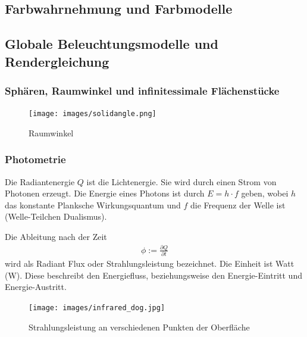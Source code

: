 \subsection{Farbwahrnehmung und Farbmodelle}

\subsection{Globale Beleuchtungsmodelle und Rendergleichung}

\subsubsection{Sphären, Raumwinkel und infinitessimale Flächenstücke}

 \begin{figure}[H]
    \centering
    \texttt{[image: images/solidangle.png]}
    \caption{Raumwinkel}
    \label{fig:cray}
\end{figure}

\subsubsection{Photometrie}

Die Radiantenergie $Q$ ist die Lichtenergie. Sie wird durch einen Strom von Photonen erzeugt. Die Energie eines Photons ist 
durch $E=h \cdot f$ geben, wobei $h$ das konstante Planksche Wirkungsquantum und $f$ die Frequenz der Welle ist (Welle-Teilchen Dualismus).  

\begin{Definition}
Die Ableitung nach der Zeit
\begin{align}
\phi := \frac{\partial Q}{\partial t}
\end{align}
wird als Radiant Flux oder Strahlungsleistung bezeichnet. Die Einheit ist Watt (W).
Diese  beschreibt den Energiefluss, beziehungsweise den Energie-Eintritt und Energie-Austritt.
\end{Definition}

 \begin{figure}[H]
    \centering
    \texttt{[image: images/infrared\_dog.jpg]}
    \caption{Strahlungsleistung an verschiedenen Punkten der Oberfläche}
    \label{fig:cray}
\end{figure}


